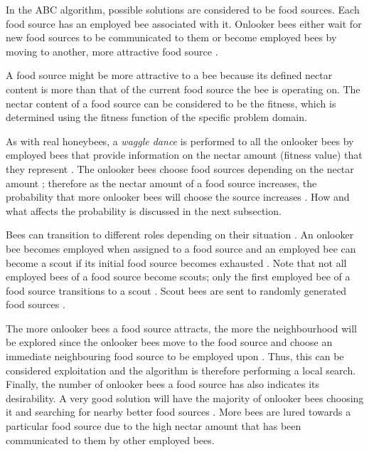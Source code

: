 In the \gls{ABC} algorithm, possible solutions are considered to be food sources\cite{ABCCompareStudy,ABCNumericalOptimization}. Each food source has an employed bee associated with it. Onlooker bees either wait for new food sources to be communicated to them or become employed bees by moving to another, more attractive food source \cite{ABCCompareStudy,ABCNumericalOptimization}. 

A food source might be more attractive to a bee because its defined nectar content is more than that of the current food source the bee is operating on\cite{ABCCompareStudy,ABCNumericalOptimization}. The nectar content of a food source can be considered to be the fitness, which is determined using the fitness function of the specific problem domain\cite{ABCCompareStudy,ABCNumericalOptimization}.

As with real honeybees, a \emph{waggle dance} is performed to all the onlooker bees by employed bees that provide information on the nectar amount (fitness value) that they represent \cite{ABCReconfigDistro,ABCCompareStudy,ABCImageEnhancement}. The onlooker bees choose food sources depending on the nectar amount \cite{ABCReconfigDistro,ABCCompareStudy,ABCImageEnhancement}; therefore as the nectar amount of a food source increases, the probability that more onlooker bees will choose the source increases \cite{ABCReconfigDistro,ABCCompareStudy,ABCImageEnhancement}. How and what affects the probability is discussed in the next subsection.

Bees can transition to different roles depending on their situation \cite{ABCCompareStudy,ABCNumericalOptimization}. An onlooker bee becomes employed when assigned to a food source and an employed bee can become a scout if its initial food source becomes exhausted \cite{ABCImageEnhancement,ABCCompareStudy,ABCReconfigDistro}. Note that not all employed bees of a food source become scouts; only the first employed bee of a food source transitions to a scout \cite{ABCImageEnhancement,ABCCompareStudy,ABCReconfigDistro}. Scout bees are sent to randomly generated food sources \cite{ABCImageEnhancement,ABCCompareStudy,ABCReconfigDistro}. 

The more onlooker bees a food source attracts, the more the neighbourhood will be explored since the onlooker bees move to the food source and choose an immediate neighbouring food source to be employed upon \cite{ABCCompareStudy,ABCNumericalOptimization}. Thus, this can be considered exploitation and the algorithm is therefore performing a local search\cite{ABCCompareStudy,ABCReconfigDistro,ABCNumericalOptimization}. Finally, the number of onlooker bees a food source has also indicates its desirability. A very good solution will have the majority of onlooker bees choosing it and searching for nearby better food sources \cite{ABCCompareStudy,ABCReconfigDistro,ABCNumericalOptimization}. More bees are lured towards a particular food source due to the high nectar amount that has been communicated to them by other employed bees\cite{ABCCompareStudy,ABCReconfigDistro,ABCNumericalOptimization}.

